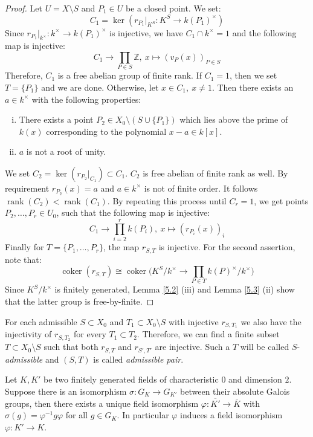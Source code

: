 \begin{proof}
Let $U = X\setminus S$ and $P_1\in U$ be a closed point. We set:
\[ C_1 = \ker(r_{P_1}|_{K^S}: K^S \to k(P_1)^\times) \]
Since $r_{P_1}|_{k^\times}:k^\times \to k(P_1)^\times$ is injective, we have $C_1\cap k^\times = 1$ and the following map is injective:
\[ C_1 \to\prod_{P\in S}\mathbb{Z},\ x \mapsto (v_P(x))_{P\in S} \]
Therefore, $C_1$ is a free abelian group of finite rank. If $C_1 = 1$, then we set $T = \{P_1\}$ and we are done. Otherwise, let $x\in C_1,\ x\neq 1$. Then there exists an $a\in k^\times$ with the following properties:
\begin{enumerate}[(i)]
\item There exists a point $P_2\in X_0\setminus(S\cup\{P_1\})$ which lies above the prime of $k(x)$ corresponding to the polynomial $x-a\in k[x]$.
\item $a$ is not a root of unity.
\end{enumerate}
We set $C_2 = \ker(r_{P_2}|_{C_1})\subset C_1$. $C_2$ is free abelian of finite rank as well. By requirement $r_{P_2}(x)=a$ and $a\in k^\times$ is not of finite order. It follows $\operatorname{rank}(C_2) < \operatorname{rank}(C_1)$. By repeating this process until $C_r=1$, we get points $P_2,\ldots,P_r\in U_0$, such that the following map is injective:
\[ C_1\to\prod_{i=2}^{r} k(P_i),\ x\mapsto(r_{P_i}(x))_i \]
Finally for $T=\{P_1,\ldots,P_r\}$, the map $r_{S,T}$ is injective. For the second assertion, note that:
\[ \operatorname{coker}(r_{S,T}) \cong\operatorname{coker}\Big(K^S/k^\times \to \prod_{P\in T}k(P)^\times /k^\times \Big) \]
Since $K^S/k^\times$ is finitely generated, Lemma \ref{5.2} (iii) and Lemma \ref{5.3} (ii) show that the latter group is free-by-finite.
\end{proof}

\begin{definition}
For each admissible $S\subset X_0$ and $T_1\subset X_0\setminus S$ with injective $r_{S,T_1}$ we also have the injectivity of $r_{S,T_2}$ for every $T_1 \subset T_2$. Therefore,  we can find a finite subset $T\subset X_0\setminus S$ such that both $r_{S,T}$ and $r_{S',T'}$ are injective. Such a $T$ will be called $S$-\textit{admissible} and $(S,T)$ is called \textit{admissible pair}.
\end{definition}

\begin{theorem}\label{1.1}
Let $K,K'$ be two finitely generated fields of characteristic $0$ and dimension $2$. Suppose there is an isomorphism $\sigma:G_K\to G_{K'}$ between their absolute Galois groups, then there exists a unique field isomorphism $\varphi:\overline{K'}\to\overline{K}$ with $\sigma(g)=\varphi^{-1}g\varphi$ for all $g\in G_K$. In particular $\varphi$ induces a field isomorphism $\varphi:K'\to K$.
\end{theorem}

